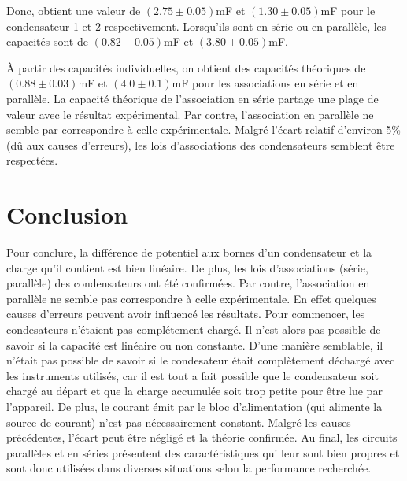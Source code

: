 \documentclass[11pt]{article}
\begin{document}
Donc, obtient une valeur de $(2.75\pm 0.05)$mF et $(1.30\pm 0.05)$mF pour le condensateur 1 et 2 respectivement. Lorsqu'ils sont en série ou en parallèle, les capacités sont de $(0.82\pm 0.05)$mF et $(3.80\pm 0.05)$mF.\pagebreak

À partir des capacités individuelles, on obtient des capacités théoriques de $(0.88\pm 0.03)$mF et $(4.0\pm 0.1)$mF pour les associations en série et en parallèle. La capacité théorique de l'association en série partage une plage de valeur avec le résultat expérimental. Par contre, l'association en parallèle ne semble par correspondre à celle expérimentale. Malgré l'écart relatif d'environ 5\% (dû aux causes d'erreurs), les lois d'associations des condensateurs semblent être respectées.

\section{Conclusion}
Pour conclure, la différence de potentiel aux bornes d’un condensateur et la charge qu’il contient est bien linéaire. De plus, les lois d’associations (série, parallèle) des condensateurs ont été confirmées. Par contre, l’association en parallèle ne semble pas correspondre à celle expérimentale. En effet quelques causes d’erreurs peuvent avoir influencé les résultats. Pour commencer, les condesateurs n'étaient pas complétement chargé. Il n'est alors pas possible de savoir si la capacité est linéaire ou non constante. D'une manière semblable, il n'était pas possible de savoir si le condesateur était complètement déchargé avec les instruments utilisés, car il est tout a fait possible que le condensateur soit chargé au départ et que la charge accumulée soit trop petite pour être lue par l'appareil. De plus, le courant émit par le bloc d'alimentation (qui alimente la source de courant) n'est pas nécessairement constant. Malgré les causes précédentes, l’écart peut être négligé et la théorie confirmée. Au final, les circuits parallèles et en séries présentent des caractéristiques qui leur sont bien propres et sont donc utilisées dans diverses situations selon la performance recherchée.
\end{document}
